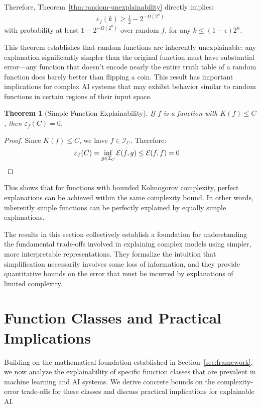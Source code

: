 \documentclass[11pt,letter,leqno]{article}
\newtheorem{theorem}{Theorem}[section]
\begin{document}
Therefore, Theorem~\ref{thm:random-unexplainability} directly implies:
\begin{align}
\varepsilon_f(k) \geq \frac{1}{2} - 2^{-\Omega(2^n)}
\end{align}
with probability at least $1 - 2^{-\Omega(2^n)}$ over random $f$, for any $k \leq (1-\epsilon)2^n$.

This theorem establishes that random functions are inherently unexplainable: any explanation significantly simpler than the original function must have substantial error---any function that doesn’t encode nearly the entire truth table of a random function does barely better than flipping a coin.  This result has important implications for complex AI systems that may exhibit behavior similar to random functions in certain regions of their input space.

\begin{theorem}[Simple Function Explainability]
\label{thm:simple-explainability}
If $f$ is a function with $K(f) \leq C$, then $\varepsilon_f(C) = 0$.
\end{theorem}

\begin{proof}
Since $K(f) \leq C$, we have $f \in \mathcal{I}_C$. Therefore:
\begin{align}
\varepsilon_f(C) &= \inf_{g \in \mathcal{I}_C} \mathcal{E}(f, g) \leq \mathcal{E}(f, f) = 0 \qedhere
\end{align}
\end{proof}

This shows that for functions with bounded Kolmogorov complexity, perfect explanations can be achieved within the same complexity bound.  In other words, inherently simple functions can be perfectly explained by equally simple explanations.

The results in this section collectively establish a foundation for understanding the fundamental trade-offs involved in explaining complex models using simpler, more interpretable representations.  They formalize the intuition that simplification necessarily involves some loss of information, and they provide quantitative bounds on the error that must be incurred by explanations of limited complexity.

\section{Function Classes and Practical Implications}
\label{sec:function-classes}

Building on the mathematical foundation established in Section~\ref{sec:framework}, we now analyze the explainability of specific function classes that are prevalent in machine learning and AI systems.  We derive concrete bounds on the complexity-error trade-offs for these classes and discuss practical implications for explainable AI.
\end{document}
